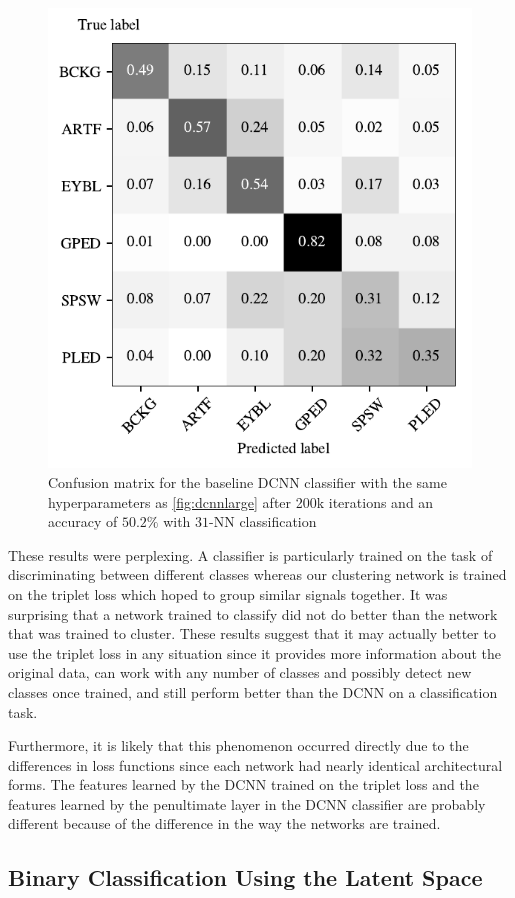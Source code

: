 \begin{figure}[!ht]
	\centering
	\includegraphics[width=0.55\linewidth]{pictures/conf_mat_baseline.pdf}
	\caption[Confusion matrix for the baseline DCNN classifier]{Confusion matrix for the baseline DCNN classifier with the same hyperparameters as \cref{fig:dcnnlarge} after 200k iterations and an accuracy of $50.2\%$ with $31$-NN classification}\label{fig:dcnnclasslarge}  
\end{figure}

These results were perplexing. A classifier is particularly trained on the task of discriminating between different classes whereas our clustering network is trained on the triplet loss which hoped to group similar signals together. It was surprising that a network trained to classify did not do better than the network that was trained to cluster. These results suggest that it may actually better to use the triplet loss in any situation since it provides more information about the original data, can work with any number of classes and possibly detect new classes once trained, and still perform better than the DCNN on a classification task. 

Furthermore, it is likely that this phenomenon occurred directly due to the differences in loss functions since each network had nearly identical architectural forms. The features learned by the DCNN trained on the triplet loss and the features learned by the penultimate layer in the DCNN classifier are probably different because of the difference in the way the networks are trained.

\subsection{Binary Classification Using the Latent Space}

